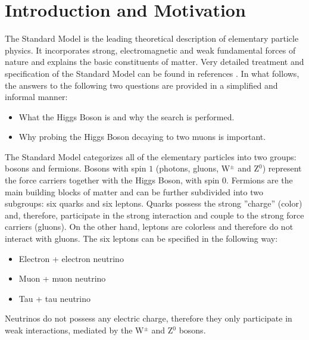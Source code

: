\section{Introduction and Motivation} \label{section:higgs_introduction}
The Standard Model is the leading theoretical description of elementary particle physics. It incorporates strong, electromagnetic and weak fundamental forces of nature and explains the basic constituents of matter. Very detailed treatment and specification of the Standard Model can be found in references \cite{Peskin,Griffiths,Nikhef}. In what follows, the answers to the following two questions are provided in a simplified and informal manner:
\begin{itemize}
    \item What the Higgs Boson is and why the search is performed.
    \item Why probing the Higgs Boson decaying to two muons is important.
\end{itemize}

The Standard Model categorizes all of the elementary particles into two groups: bosons and fermions. Bosons with spin $1$ (photons, gluons, W$^{\pm}$ and Z$^{0}$) represent the force carriers together with the Higgs Boson, with spin $0$. Fermions are the main building blocks of matter and can be further subdivided into two subgroups: six quarks and six leptons. Quarks possess the strong ''charge'' (color) and, therefore, participate in the strong interaction and couple to the strong force carriers (gluons). On the other hand, leptons are colorless and therefore do not interact with gluons. The six leptons can be specified in the following way:
\begin{itemize}
    \item Electron + electron neutrino
    \item Muon + muon neutrino
    \item Tau + tau neutrino
\end{itemize}
Neutrinos do not possess any electric charge, therefore they only participate in weak interactions, mediated by the W$^{\pm}$ and Z$^{0}$ bosons.

